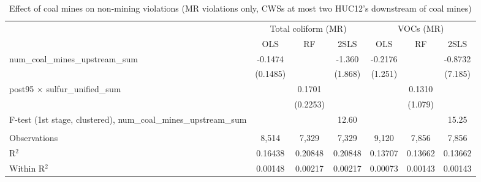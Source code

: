 
\begin{table}[htbp]
   
   \caption{\label{2sls_dwnstrm2step_nonminevio_mr_ivsum} Effect of coal mines on non-mining violations (MR violations only, CWSs at most two HUC12's downstream of coal mines)}
   \bigskip
   
   \centering
   
   \begin{adjustbox}{width = \textwidth, center}
      
      
      \begin{tabular}{lcccccc}
         \toprule
         
          & \multicolumn{3}{c}{Total coliform (MR)} & \multicolumn{3}{c}{VOCs (MR)}\\
         
                                                                            & OLS           & RF            & 2SLS          & OLS           & RF            & 2SLS\\  
         
         \midrule 
         num\_coal\_mines\_upstream\_sum                                    & -0.1474       &               & -1.360        & -0.2176       &               & -0.8732\\   
                                                                            & (0.1485)      &               & (1.868)       & (1.251)       &               & (7.185)\\   
         post95 $\times$ sulfur\_unified\_sum                               &               & 0.1701        &               &               & 0.1310        &   \\   
                                                                            &               & (0.2253)      &               &               & (1.079)       &   \\   
         
         F-test (1st stage, clustered), num\_coal\_mines\_upstream\_sum     &               &               & 12.60         &               &               & 15.25\\  
         
          \\
         
         Observations                                                       & 8,514         & 7,329         & 7,329         & 9,120         & 7,856         & 7,856\\  
         R$^2$                                                              & 0.16438       & 0.20848       & 0.20848       & 0.13707       & 0.13662       & 0.13662\\  
         Within R$^2$                                                       & 0.00148       & 0.00217       & 0.00217       & 0.00073       & 0.00143       & 0.00143\\  
         

\end{tabular}
\end{adjustbox}
\end{table}
